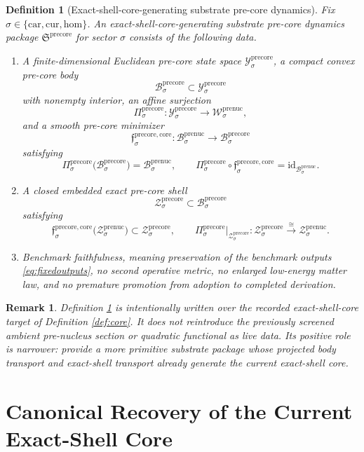 \documentclass[11pt]{article}
\newcommand{\Car}{\mathrm{car}}
\newcommand{\Cur}{\mathrm{cur}}
\newcommand{\Hom}{\mathrm{hom}}
\newcommand{\PreNucSpace}[1]{\mathcal W_{#1}^{\mathrm{prenuc}}}
\newcommand{\PreNucBody}[1]{\mathcal B_{#1}^{\mathrm{prenuc}}}
\newcommand{\PreNucShellSet}[1]{\mathcal Z_{#1}^{\mathrm{prenuc}}}
\newcommand{\PreCorePackage}{\mathfrak S^{\mathrm{precore}}}
\newcommand{\PreCoreSpace}[1]{\mathcal Y_{#1}^{\mathrm{precore}}}
\newcommand{\PreCoreBody}[1]{\mathcal B_{#1}^{\mathrm{precore}}}
\newcommand{\PreCoreProj}[1]{\Pi_{#1}^{\mathrm{precore}}}
\newcommand{\PreCoreCoreMin}[1]{\mathfrak f_{#1}^{\mathrm{precore,core}}}
\newcommand{\PreCoreShellSet}[1]{\mathcal Z_{#1}^{\mathrm{precore}}}
\newtheorem{definition}{Definition}
\newtheorem{remark}{Remark}
\begin{document}
\begin{definition}[Exact-shell-core-generating substrate pre-core dynamics]
\label{def:precore}
Fix \(\sigma\in\{\Car,\Cur,\Hom\}\). An \emph{exact-shell-core-generating substrate pre-core dynamics package} \(\PreCorePackage\) for sector \(\sigma\) consists of the following data.
\begin{enumerate}
    \item A finite-dimensional Euclidean pre-core state space \(\PreCoreSpace{\sigma}\), a compact convex pre-core body
    \[
    \PreCoreBody{\sigma}\subset\PreCoreSpace{\sigma}
    \]
    with nonempty interior, an affine surjection
    \[
    \PreCoreProj{\sigma}:\PreCoreSpace{\sigma}\to\PreNucSpace{\sigma},
    \]
    and a smooth pre-core minimizer
    \[
    \PreCoreCoreMin{\sigma}:\PreNucBody{\sigma}\to\PreCoreBody{\sigma}
    \]
    satisfying
    \[
    \PreCoreProj{\sigma}\bigl(\PreCoreBody{\sigma}\bigr)=\PreNucBody{\sigma},
    \qquad
    \PreCoreProj{\sigma}\circ\PreCoreCoreMin{\sigma}
    =
    \mathrm{id}_{\PreNucBody{\sigma}}.
    \]
    \item A closed embedded exact pre-core shell
    \[
    \PreCoreShellSet{\sigma}\subset\PreCoreBody{\sigma}
    \]
    satisfying
    \[
    \PreCoreCoreMin{\sigma}\bigl(\PreNucShellSet{\sigma}\bigr)
    \subset
    \PreCoreShellSet{\sigma},
    \qquad
    \PreCoreProj{\sigma}\big|_{\PreCoreShellSet{\sigma}}
    :
    \PreCoreShellSet{\sigma}
    \xrightarrow{\cong}
    \PreNucShellSet{\sigma}.
    \]
    \item Benchmark faithfulness, meaning preservation of the benchmark outputs \eqref{eq:fixedoutputs}, no second operative metric, no enlarged low-energy matter law, and no premature promotion from adoption to completed derivation.
\end{enumerate}
\end{definition}

\begin{remark}
Definition \ref{def:precore} is intentionally written over the recorded exact-shell-core target of Definition \ref{def:core}. It does not reintroduce the previously screened ambient pre-nucleus section or quadratic functional as live data. Its positive role is narrower: provide a more primitive substrate package whose projected body transport and exact-shell transport already generate the current exact-shell core.
\end{remark}

\section{Canonical Recovery of the Current Exact-Shell Core}
\end{document}
